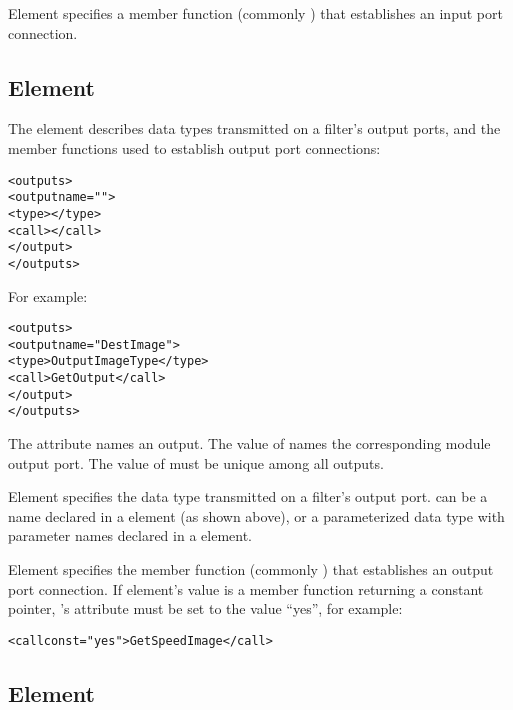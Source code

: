 Element  specifies a member function (commonly
) that establishes an input port connection.

\subsection{Element }
\label{sec:itk_mods:outputs_element}

The  element describes  data types transmitted
on a filter's output ports, and the member functions used to
establish  output port connections:

\begin{alltt}
  <outputs>
    <output name="">
      <type></type>
      <call></call>
    </output>
    \velide
  </outputs>
\end{alltt}

For example:

\begin{alltt}
  <outputs>
    <output name="DestImage">
      <type>OutputImageType</type>
      <call>GetOutput</call>
    </output>
  </outputs>
\end{alltt}


The  attribute names an output.  The value of
 names the corresponding \sr{} module output port.
The value of  must be unique among all outputs.

Element  specifies the data type transmitted on a
filter's output port.   can be a name
declared in a  element (as shown above), or a
parameterized data type with parameter names declared in a
 element.

Element  specifies the member function (commonly
) that establishes an output port connection.  If
 element's value is a member function returning a
constant pointer, 's  attribute
must be set to the value ``yes'', for example:

\begin{alltt}
  <call const="yes">GetSpeedImage</call>
\end{alltt}

\subsection{Element }
\label{sec:itk_mods:param_element}

